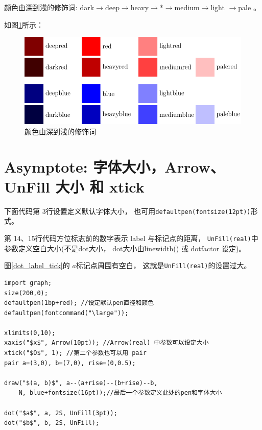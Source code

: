 \documentclass[a4paper,11pt]{article}
\begin{document}
颜色由深到浅的修饰词: dark$\to$deep$\to$heavy$\to$*$\to$medium$\to$light%
$\to$pale 。

如图\ref{fig:asy_color2}所示：
\begin{figure}[htpb]
\centering
\includegraphics[scale=0.7]{./figs/asy_color2.pdf}
\caption{颜色由深到浅的修饰词}
\label{fig:asy_color2}
\end{figure}

\section{Asymptote: 字体大小，Arrow、UnFill 大小 和 xtick}
下面代码第 3行设置定义默认字体大小，
也可用\verb+defaultpen(fontsize(12pt))+形式。

第 14、15行代码方位标志前的数字表示
label 与标记点的距离，
\verb+UnFill(real)+中参数定义空白大小(不是dot大小，
dot大小由linewidth() 或 dotfactor 设定)。

图\ref{dot_label_tick}的 $a$标记点周围有空白，
这就是\verb+UnFill(real)+的设置过大。

\begin{Verbatim}
import graph;
size(200,0);
defaultpen(1bp+red); //设定默认pen直径和颜色
defaultpen(fontcommand("\large"));

xlimits(0,10);
xaxis("$x$", Arrow(10pt)); //Arrow(real) 中参数可以设定大小
xtick("$O$", 1); //第二个参数也可以用 pair
pair a=(3,0), b=(7,0), rise=(0,0.5);

draw("$(a, b)$", a--(a+rise)--(b+rise)--b,
    N, blue+fontsize(16pt));//最后一个参数定义此处的pen和字体大小

dot("$a$", a, 2S, UnFill(3pt));
dot("$b$", b, 2S, UnFill);
\end{Verbatim}
\end{document}
